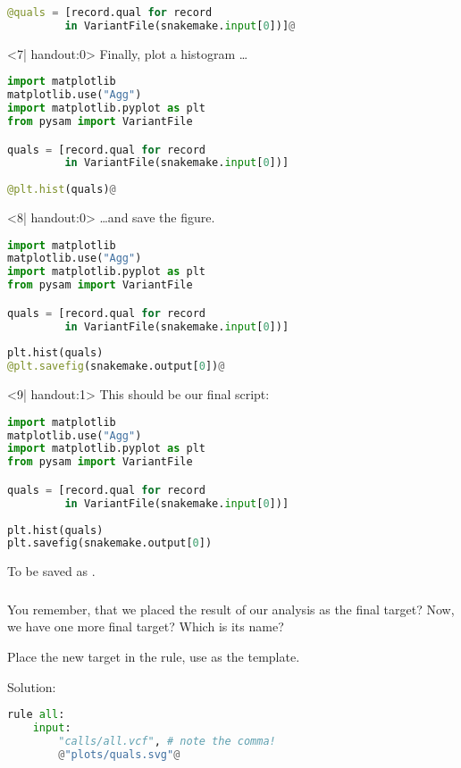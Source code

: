\begin{frame}[fragile]
\begin{onlyenv}
\begin{lstlisting}[language=Python,style=Python]
@quals = [record.qual for record 
         in VariantFile(snakemake.input[0])]@
   \end{lstlisting}
  \end{onlyenv}
  \begin{onlyenv}<7| handout:0>
   Finally, plot a histogram \ldots
   \begin{lstlisting}[language=Python,style=Python]
import matplotlib
matplotlib.use("Agg")
import matplotlib.pyplot as plt
from pysam import VariantFile

quals = [record.qual for record 
         in VariantFile(snakemake.input[0])]
         
@plt.hist(quals)@
   \end{lstlisting}
  \end{onlyenv}
  \begin{onlyenv}<8| handout:0>
   \ldots and save the figure.
   \begin{lstlisting}[language=Python,style=Python]
import matplotlib
matplotlib.use("Agg")
import matplotlib.pyplot as plt
from pysam import VariantFile

quals = [record.qual for record 
         in VariantFile(snakemake.input[0])]
         
plt.hist(quals)
@plt.savefig(snakemake.output[0])@
   \end{lstlisting}
  \end{onlyenv}
  \begin{onlyenv}<9| handout:1>
   This should be our final script:
   \begin{lstlisting}[language=Python,style=Python]
import matplotlib
matplotlib.use("Agg")
import matplotlib.pyplot as plt
from pysam import VariantFile

quals = [record.qual for record 
         in VariantFile(snakemake.input[0])]
         
plt.hist(quals)
plt.savefig(snakemake.output[0])
   \end{lstlisting}
  To be saved as .
  \end{onlyenv}
\end{frame}

\begin{frame}[fragile]
  \frametitle{}
  \begin{question}
  	You remember, that we placed the result of our analysis as the final target?\newline
  	Now, we have one more final target? Which is its name?
  \end{question}
  \begin{task}
  	Place the new target in the  rule, use  as the template. 
  \end{task}
  \pause
  Solution:
  \begin{lstlisting}[language=Python,style=Python]
rule all:
    input:
        "calls/all.vcf", # note the comma!
        @"plots/quals.svg"@
  \end{lstlisting}
\end{frame}


